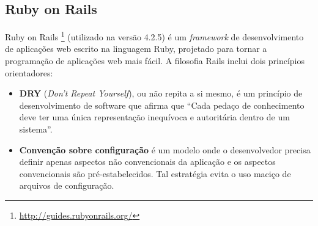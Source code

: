 \begin{apendicesenv}
\subsection{Ruby on Rails}

Ruby on Rails \footnote{\url{http://guides.rubyonrails.org/}} (utilizado na versão 4.2.5) é um \textit{framework} de desenvolvimento de aplicações web escrito na linguagem Ruby, projetado para tornar a programação de aplicações web mais fácil. A filosofia Rails inclui dois princípios orientadores:

\begin{itemize}
	\item \textbf{DRY} (\textit{Don't Repeat Yourself}), ou não repita a si mesmo, é um princípio de desenvolvimento de software que afirma que ``Cada pedaço de conhecimento deve ter uma única representação inequívoca e autoritária dentro de um sistema''\cite{wilson2012practices}.

	\item \textbf{Convenção sobre configuração} é um modelo onde o desenvolvedor precisa definir apenas aspectos não convencionais da aplicação e os aspectos convencionais são pré-estabelecidos. Tal estratégia evita o uso maciço de arquivos de configuração.
\end{itemize}

\end{apendicesenv}
